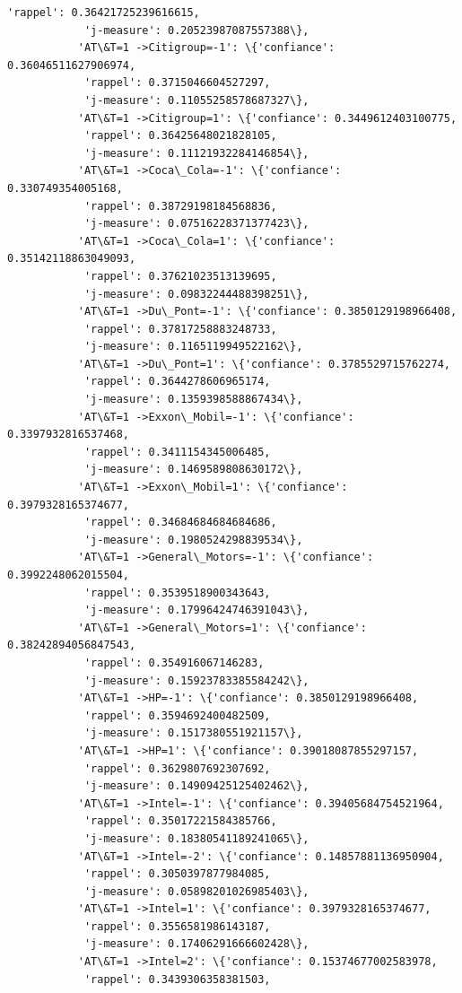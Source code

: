 \documentclass[11pt]{article}
\begin{document}
\begin{Verbatim}[commandchars=\\\{\}]
            'rappel': 0.36421725239616615,
            'j-measure': 0.20523987087557388\},
           'AT\&T=1 ->Citigroup=-1': \{'confiance': 0.36046511627906974,
            'rappel': 0.3715046604527297,
            'j-measure': 0.11055258578687327\},
           'AT\&T=1 ->Citigroup=1': \{'confiance': 0.3449612403100775,
            'rappel': 0.36425648021828105,
            'j-measure': 0.11121932284146854\},
           'AT\&T=1 ->Coca\_Cola=-1': \{'confiance': 0.330749354005168,
            'rappel': 0.38729198184568836,
            'j-measure': 0.07516228371377423\},
           'AT\&T=1 ->Coca\_Cola=1': \{'confiance': 0.35142118863049093,
            'rappel': 0.37621023513139695,
            'j-measure': 0.09832244488398251\},
           'AT\&T=1 ->Du\_Pont=-1': \{'confiance': 0.3850129198966408,
            'rappel': 0.37817258883248733,
            'j-measure': 0.1165119949522162\},
           'AT\&T=1 ->Du\_Pont=1': \{'confiance': 0.3785529715762274,
            'rappel': 0.3644278606965174,
            'j-measure': 0.1359398588867434\},
           'AT\&T=1 ->Exxon\_Mobil=-1': \{'confiance': 0.3397932816537468,
            'rappel': 0.3411154345006485,
            'j-measure': 0.1469589808630172\},
           'AT\&T=1 ->Exxon\_Mobil=1': \{'confiance': 0.3979328165374677,
            'rappel': 0.34684684684684686,
            'j-measure': 0.1980524298839534\},
           'AT\&T=1 ->General\_Motors=-1': \{'confiance': 0.3992248062015504,
            'rappel': 0.3539518900343643,
            'j-measure': 0.17996424746391043\},
           'AT\&T=1 ->General\_Motors=1': \{'confiance': 0.38242894056847543,
            'rappel': 0.354916067146283,
            'j-measure': 0.15923783385584242\},
           'AT\&T=1 ->HP=-1': \{'confiance': 0.3850129198966408,
            'rappel': 0.3594692400482509,
            'j-measure': 0.1517380551921157\},
           'AT\&T=1 ->HP=1': \{'confiance': 0.39018087855297157,
            'rappel': 0.3629807692307692,
            'j-measure': 0.14909425125402462\},
           'AT\&T=1 ->Intel=-1': \{'confiance': 0.39405684754521964,
            'rappel': 0.35017221584385766,
            'j-measure': 0.18380541189241065\},
           'AT\&T=1 ->Intel=-2': \{'confiance': 0.14857881136950904,
            'rappel': 0.3050397877984085,
            'j-measure': 0.05898201026985403\},
           'AT\&T=1 ->Intel=1': \{'confiance': 0.3979328165374677,
            'rappel': 0.3556581986143187,
            'j-measure': 0.17406291666602428\},
           'AT\&T=1 ->Intel=2': \{'confiance': 0.15374677002583978,
            'rappel': 0.3439306358381503,

\end{Verbatim}
\end{document}
